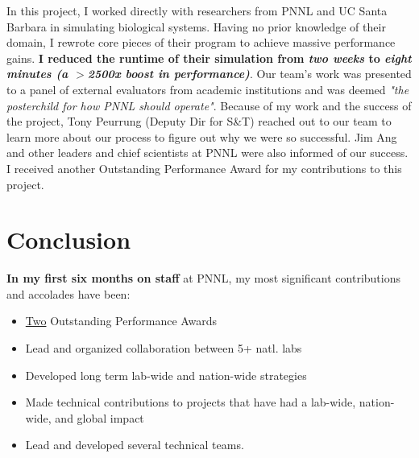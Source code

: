 \documentclass{article}
\begin{document}
In this project, I worked directly with researchers from PNNL and UC Santa Barbara in simulating biological systems.
Having no prior knowledge of their domain, I rewrote core pieces of their program to achieve massive performance gains.
\textbf{I reduced the runtime of their simulation from \textit{two weeks} to \textit{eight minutes (a $>$2500x boost in performance)}}.
Our team's work was presented to a panel of external evaluators from academic institutions and was deemed \textit{"the posterchild for how PNNL should operate"}.
Because of my work and the success of the project, Tony Peurrung (Deputy Dir for S\&T) reached out to our team to learn more about our process to figure out why we were so successful.
Jim Ang and other leaders and chief scientists at PNNL were also informed of our success.
I received another Outstanding Performance Award for my contributions to this project.

\section{Conclusion}

\textbf{In my first six months on staff} at PNNL, my most significant contributions and accolades have been:

\begin{itemize}
  \item \underline{Two} Outstanding Performance Awards
  \item Lead and organized collaboration between 5+ natl. labs
  \item Developed long term lab-wide and nation-wide strategies
  \item Made technical contributions to projects that have had a lab-wide, nation-wide, and global impact
  \item Lead and developed several technical teams.
\end{itemize}

\bigskip
\end{document}
